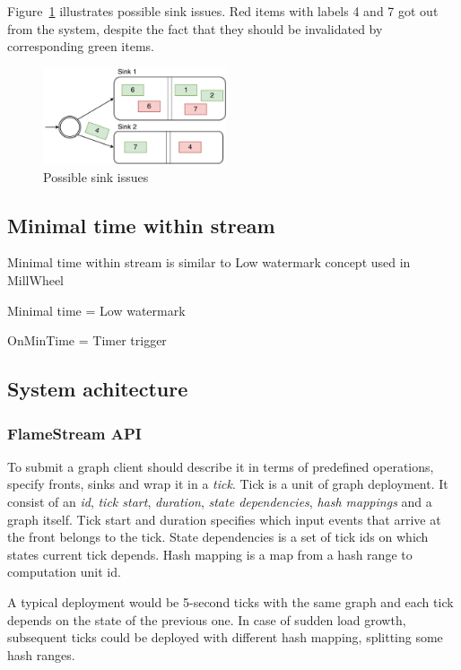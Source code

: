 Figure~\ref{invalidation-problems-figure} illustrates possible sink issues. Red items with labels 4 and 7 got out from the system, despite the fact that they should be invalidated by corresponding green items. 

\begin{figure}[htbp]
  \centering
  \includegraphics[width=0.48\textwidth]{pics/invalidation_problems}
  \caption{Possible sink issues}
  \label {invalidation-problems-figure}
\end{figure}

\subsection{Minimal time within stream}
Minimal time within stream is similar to Low watermark concept used in MillWheel~\cite{Akidau:2013:MFS:2536222.2536229}

Minimal time = Low watermark

OnMinTime = Timer trigger

\subsection{System achitecture}

\subsubsection{FlameStream API}
To submit a graph client should describe it in terms of predefined operations, specify fronts, sinks and wrap it in a {\it tick}. Tick is a unit of graph deployment. It consist of an {\it id}, {\it tick start}, {\it duration}, {\it state dependencies}, {\it hash mappings} and a graph itself. Tick start and duration specifies which input events that arrive at the front belongs to the tick. State dependencies is a set of tick ids on which states current tick depends. Hash mapping is a map from a hash range to computation unit id. 

A typical deployment would be 5-second ticks with the same graph and each tick depends on the state of the previous one. In case of sudden load growth, subsequent ticks could be deployed with different hash mapping, splitting some hash ranges.

